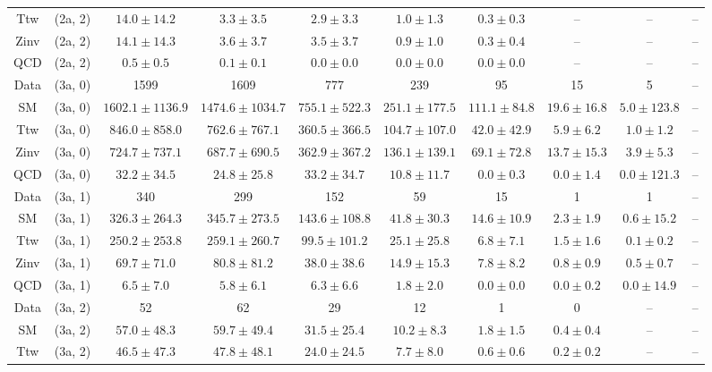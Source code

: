 \begin{table}[h!]
{\begin{tabular}{cccccccccc}
	Ttw & (2a, 2) & $14.0\pm 14.2$ & $3.3\pm 3.5$ & $2.9\pm 3.3$ & $1.0\pm 1.3$ & $0.3\pm 0.3$ & -- & -- & -- \\[0.5ex] 
	Zinv & (2a, 2) & $14.1\pm 14.3$ & $3.6\pm 3.7$ & $3.5\pm 3.7$ & $0.9\pm 1.0$ & $0.3\pm 0.4$ & -- & -- & -- \\[0.5ex] 
	QCD & (2a, 2) & $0.5\pm 0.5$ & $0.1\pm 0.1$ & $0.0\pm 0.0$ & $0.0\pm 0.0$ & $0.0\pm 0.0$ & -- & -- & -- \\[0.5ex] 
	Data & (3a, 0) & 1599 & 1609 & 777 & 239 & 95 & 15 & 5 & -- \\[0.5ex] 
	SM & (3a, 0) & $1602.1\pm 1136.9$ & $1474.6\pm 1034.7$ & $755.1\pm 522.3$ & $251.1\pm 177.5$ & $111.1\pm 84.8$ & $19.6\pm 16.8$ & $5.0\pm 123.8$ & -- \\[0.5ex] 
	Ttw & (3a, 0) & $846.0\pm 858.0$ & $762.6\pm 767.1$ & $360.5\pm 366.5$ & $104.7\pm 107.0$ & $42.0\pm 42.9$ & $5.9\pm 6.2$ & $1.0\pm 1.2$ & -- \\[0.5ex] 
	Zinv & (3a, 0) & $724.7\pm 737.1$ & $687.7\pm 690.5$ & $362.9\pm 367.2$ & $136.1\pm 139.1$ & $69.1\pm 72.8$ & $13.7\pm 15.3$ & $3.9\pm 5.3$ & -- \\[0.5ex] 
	QCD & (3a, 0) & $32.2\pm 34.5$ & $24.8\pm 25.8$ & $33.2\pm 34.7$ & $10.8\pm 11.7$ & $0.0\pm 0.3$ & $0.0\pm 1.4$ & $0.0\pm 121.3$ & -- \\[0.5ex] 
	Data & (3a, 1) & 340 & 299 & 152 & 59 & 15 & 1 & 1 & -- \\[0.5ex] 
	SM & (3a, 1) & $326.3\pm 264.3$ & $345.7\pm 273.5$ & $143.6\pm 108.8$ & $41.8\pm 30.3$ & $14.6\pm 10.9$ & $2.3\pm 1.9$ & $0.6\pm 15.2$ & -- \\[0.5ex] 
	Ttw & (3a, 1) & $250.2\pm 253.8$ & $259.1\pm 260.7$ & $99.5\pm 101.2$ & $25.1\pm 25.8$ & $6.8\pm 7.1$ & $1.5\pm 1.6$ & $0.1\pm 0.2$ & -- \\[0.5ex] 
	Zinv & (3a, 1) & $69.7\pm 71.0$ & $80.8\pm 81.2$ & $38.0\pm 38.6$ & $14.9\pm 15.3$ & $7.8\pm 8.2$ & $0.8\pm 0.9$ & $0.5\pm 0.7$ & -- \\[0.5ex] 
	QCD & (3a, 1) & $6.5\pm 7.0$ & $5.8\pm 6.1$ & $6.3\pm 6.6$ & $1.8\pm 2.0$ & $0.0\pm 0.0$ & $0.0\pm 0.2$ & $0.0\pm 14.9$ & -- \\[0.5ex] 
	Data & (3a, 2) & 52 & 62 & 29 & 12 & 1 & 0 & -- & -- \\[0.5ex] 
	SM & (3a, 2) & $57.0\pm 48.3$ & $59.7\pm 49.4$ & $31.5\pm 25.4$ & $10.2\pm 8.3$ & $1.8\pm 1.5$ & $0.4\pm 0.4$ & -- & -- \\[0.5ex] 
	Ttw & (3a, 2) & $46.5\pm 47.3$ & $47.8\pm 48.1$ & $24.0\pm 24.5$ & $7.7\pm 8.0$ & $0.6\pm 0.6$ & $0.2\pm 0.2$ & -- & -- \\[0.5ex] 

\end{tabular}}
\end{table}
